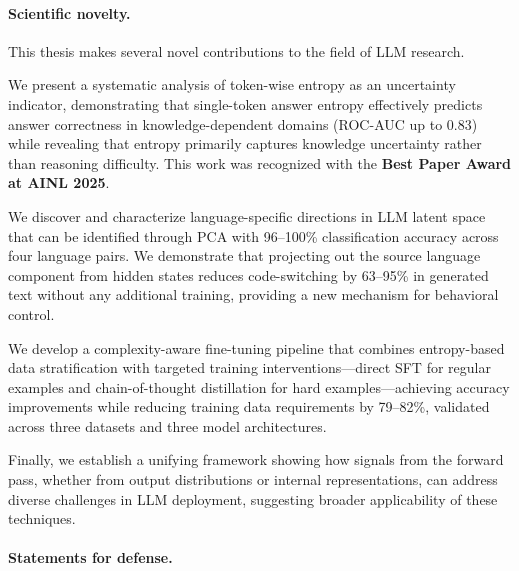 \paragraph{Scientific novelty.}
This thesis makes several novel contributions to the field of LLM research.

We present a systematic analysis of token-wise entropy as an uncertainty indicator, demonstrating that single-token answer entropy effectively predicts answer correctness in knowledge-dependent domains (ROC-AUC up to 0.83) while revealing that entropy primarily captures knowledge uncertainty rather than reasoning difficulty. This work was recognized with the \textbf{Best Paper Award at AINL 2025}.

We discover and characterize language-specific directions in LLM latent space that can be identified through PCA with 96--100\% classification accuracy across four language pairs. We demonstrate that projecting out the source language component from hidden states reduces code-switching by 63--95\% in generated text without any additional training, providing a new mechanism for behavioral control.

We develop a complexity-aware fine-tuning pipeline that combines entropy-based data stratification with targeted training interventions---direct SFT for regular examples and chain-of-thought distillation for hard examples---achieving accuracy improvements while reducing training data requirements by 79--82\%, validated across three datasets and three model architectures.

Finally, we establish a unifying framework showing how signals from the forward pass, whether from output distributions or internal representations, can address diverse challenges in LLM deployment, suggesting broader applicability of these techniques.

\paragraph{Statements for defense.}

